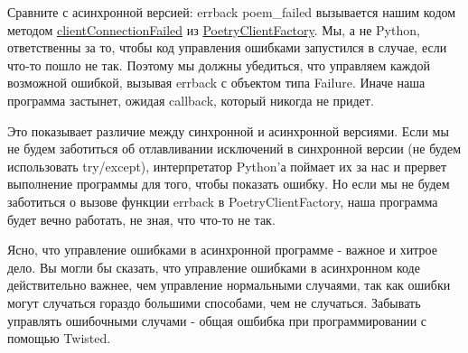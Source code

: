 Сравните с асинхронной версией: errback poem\_failed 
вызывается нашим кодом методом 
\href{http://github.com/jdavisp3/twisted-intro/blob/master/twisted-client-3/get-poetry-1.py#L77}{clientConnectionFailed} 
из 
\href{http://github.com/jdavisp3/twisted-intro/blob/master/twisted-client-3/get-poetry-1.py#L66}{PoetryClientFactory}. Мы, а не Python, ответственны за то, 
чтобы код управления ошибками запустился в случае, если 
что-то пошло не так. Поэтому мы должны убедиться, что 
управляем каждой возможной ошибкой, вызывая errback с 
объектом типа Failure. Иначе наша программа застынет, 
ожидая callback, который никогда не придет. 


Это показывает различие между синхронной и 
асинхронной версиями. Если мы не будем заботиться 
об отлавливании исключений в синхронной версии (не будем использовать try/except), 
интерпретатор Python'а поймает их за нас и прервет выполнение 
программы для того, чтобы показать ошибку. Но если 
мы не будем заботиться о вызове функции errback в PoetryClientFactory, 
наша программа будет вечно работать, не зная, что что-то не так.    



Ясно, что управление ошибками в асинхронной программе - важное 
и хитрое дело. Вы могли бы сказать, что управление ошибками в 
асинхронном коде действительно важнее, чем управление 
нормальными случаями, так как ошибки могут случаться гораздо большими 
способами, чем не случаться. Забывать управлять ошибочными случами - 
общая ошбибка при программировании с помощью Twisted.


